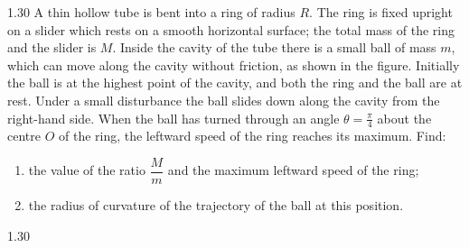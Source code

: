 \begin{problem}{1.30}
A thin hollow tube is bent into a ring of radius $R$. The ring is fixed upright on a slider which rests on a smooth horizontal surface; the total mass of the ring and the slider is $M$. Inside the cavity of the tube there is a small ball of mass $m$, which can move along the cavity without friction, as shown in the figure. Initially the ball is at the highest point of the cavity, and both the ring and the ball are at rest. Under a small disturbance the ball slides down along the cavity from the right-hand side. When the ball has turned through an angle $\theta=\frac{\pi}{4}$ about the centre $O$ of the ring, the leftward speed of the ring reaches its maximum. Find:
\begin{enumerate}[label=(\arabic*),leftmargin=2.2em,itemsep=1pt,topsep=2pt]
\item the value of the ratio $\dfrac{M}{m}$ and the maximum leftward speed of the ring;
\item the radius of curvature of the trajectory of the ball at this position.
\end{enumerate}
\end{problem}

\begin{figbox}{1.30}
\end{figbox}

